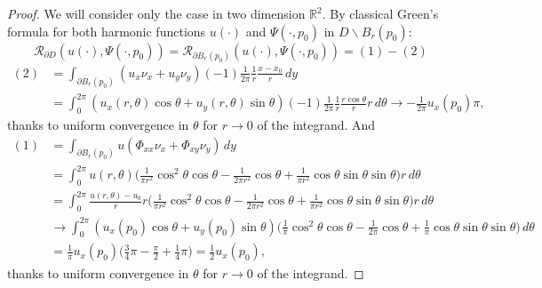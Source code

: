 \documentclass[10pt, a4paper, twoside, openright]{book}
\theoremstyle{definition}
\theoremstyle{plain}
\theoremstyle{plain}
\theoremstyle{plain}
\theoremstyle{plain}
\theoremstyle{plain}
\theoremstyle{plain}
\theoremstyle{plain}
\theoremstyle{plain}
\begin{document}
\begin{proof}
 We will consider only the case in two dimension $\mathbb{R}^2$.
 By classical Green's formula for both harmonic functions $u(\cdot)$ and $\Psi(\cdot,p_0)$ in $D\backslash B_r(p_0)$:
 \[\mathcal{R}_{\partial D}(u(\cdot),\Psi(\cdot,p_0)) = \mathcal{R}_{\partial B_r(p_0)}(u(\cdot),\Psi(\cdot,p_0)) = (1) - (2)\]
 \begin{align*}
 (2)&=\int_{\partial B_r(p_0)}(u_x\nu_x+u_y\nu_y)(-1)\frac{1}{2\pi}\frac{1}{r}\frac{x-x_0}{r}\,dy\\
 &= \int_0^{2\pi}(u_x(r,\theta)\cos\theta+u_y(r,\theta)\sin\theta)(-1)\frac{1}{2\pi}\frac{1}{r}\frac{r\cos\theta}{r}r\,d\theta \to -\frac{1}{2\pi}u_x(p_0)\pi,
 \end{align*}
 thanks to uniform convergence in $\theta$ for $r\to0$ of the integrand. And
 \begin{align*}
 (1)&=\int_{\partial B_r(p_0)}u(\Phi_{xx}\nu_x + \Phi_{xy}\nu_y)\,dy\\
 &= \int_0^{2\pi}u(r,\theta)\Big(\frac{1}{\pi r^2}\cos^2\theta\cos\theta - \frac{1}{2\pi r^2}\cos\theta + \frac{1}{\pi r^2}\cos\theta\sin\theta\sin\theta\Big)r\,d\theta\\
 &= \int_0^{2\pi}\frac{u(r,\theta)-u_0}{r}r\Big(\frac{1}{\pi r^2}\cos^2\theta\cos\theta - \frac{1}{2\pi r^2}\cos\theta + \frac{1}{\pi r^2}\cos\theta\sin\theta\sin\theta\Big)r\,d\theta\\
 & \to \int_0^{2\pi}(u_x(p_0)\cos\theta + u_y(p_0)\sin\theta)\Big(\frac{1}{\pi}\cos^2\theta\cos\theta - \frac{1}{2\pi}\cos\theta + \frac{1}{\pi}\cos\theta\sin\theta\sin\theta\Big)\,d\theta\\
 &= \frac{1}{\pi}u_x(p_0)\Big(\frac{3}{4}\pi-\frac{\pi}{2}+\frac{1}{4}\pi\Big) = \frac{1}{2}u_x(p_0),
 \end{align*}
 thanks to uniform convergence in $\theta$ for $r\to0$ of the integrand.
\end{proof}
% 
% 
\end{document}
